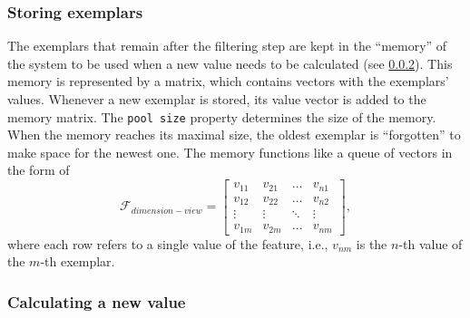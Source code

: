 \subsubsection{Storing exemplars}
\label{subsubsec:collecting_exemplars}

The exemplars that remain after the filtering step are kept in the \enquote{memory} of the system to be used when a new value needs to be calculated (see \cref{subsubsec:calculating_changed_value}).
This memory is represented by a matrix, which contains vectors with the exemplars' values.
Whenever a new exemplar is stored, its value vector is added to the memory matrix.
The \texttt{pool size} property determines the size of the memory.
When the memory reaches its maximal size, the oldest exemplar is \enquote{forgotten} to make space for the newest one.
The memory functions like a queue of vectors in the form of
%
\begin{equation}
	\label{eq:transposed_feature_matrix}
	\textbf{$\mathcal{F}_{dimension-view}$} =
	\begin{bmatrix} 
		v_{11} & v_{21} & \dots  & v_{n1}\\
		v_{12} & v_{22} & \dots  & v_{n2} \\
		\vdots & \vdots & \ddots & \vdots \\
		v_{1m} & v_{2m} & \dots  & v_{nm} 
	\end{bmatrix},
\end{equation}
\noindent
%
where each row refers to a single value of the feature, i.e., $v_{nm}$ is the $n$-th value of the $m$-th exemplar.

\subsubsection{Calculating a new value}
\label{subsubsec:calculating_changed_value}

